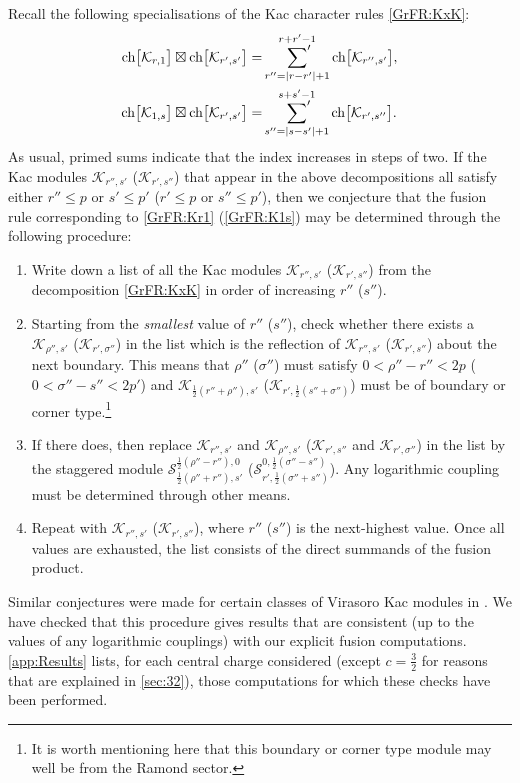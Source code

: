 \documentclass[a4paper,reqno,12pt]{report}
\theoremstyle{definition}
\numberwithin{equation}{section}
\let\originalleft\left     %
\let\originalright\right
\renewcommand{\left}{\mathopen{}\mathclose\bgroup\originalleft}
\renewcommand{\right}{\aftergroup\egroup\originalright}
\newcommand{\abs}[1]{\left\lvert #1 \right\rvert}
\newcommand{\Kac}[1]{\mathcal{K}_{#1}}       %
\newcommand{\Stag}[2]{\mathcal{S}_{#1}^{#2}} %
\newcommand{\chmap}{\mathrm{ch}}
\newcommand{\Gr}[1]{\bigl[ #1 \bigr]}            %
\newcommand{\ch}[1]{\chmap \Gr{#1}}              %
\newcommand{\Grfuse}{\mathbin{\boxtimes}}                                       %
\renewcommand{\le}{\leqslant}
\theoremstyle{plain}
\begin{document}
Recall the following specialisations of the Kac character rules \eqref{GrFR:KxK}:
\begin{subequations}
\begin{align}
\ch{\Kac{r,1}} \Grfuse \ch{\Kac{r',s'}} &= \sideset{}{'} \sum_{r'' = \abs{r-r'}+1}^{r+r'-1} \ch{\Kac{r'',s'}}, \label{GrFR:Kr1} \\
\ch{\Kac{1,s}} \Grfuse \ch{\Kac{r',s'}} &= \sideset{}{'} \sum_{s'' = \abs{s-s'}+1}^{s+s'-1} \ch{\Kac{r',s''}}. \label{GrFR:K1s}
\end{align}
\end{subequations}
As usual, primed sums indicate that the index increases in steps of two.  If the Kac modules $\Kac{r'',s'}$ ($\Kac{r',s''}$) that appear in the above decompositions all satisfy either $r'' \le p$ or $s' \le p'$ ($r' \le p$ or $s'' \le p'$), then we conjecture that the fusion rule corresponding to \cref{GrFR:Kr1} (\cref{GrFR:K1s}) may be determined through the following procedure:
\begin{enumerate}[leftmargin=*,label=\arabic*)]
\item Write down a list of all the Kac modules $\Kac{r'',s'}$ ($\Kac{r',s''}$) from the decomposition \eqref{GrFR:KxK} in order of increasing $r''$ ($s''$). \label{it:KacList}
\item Starting from the \emph{smallest} value of $r''$ ($s''$), check whether there exists a $\Kac{\rho'',s'}$ ($\Kac{r',\sigma''}$) in the list which is the reflection of $\Kac{r'',s'}$ ($\Kac{r',s''}$) about the next boundary.  This means that $\rho''$ ($\sigma''$) must satisfy $0 < \rho'' - r'' < 2p$ ($0 < \sigma'' -s'' < 2p'$) and $\Kac{\frac{1}{2} (r'' + \rho''),s'}$ ($\Kac{r',\frac{1}{2} (s'' + \sigma'')}$) must be of boundary or corner type.\footnote{It is worth mentioning here that this boundary or corner type module may well be from the Ramond sector.}
\item If there does, then replace $\Kac{r'',s'}$ and $\Kac{\rho'',s'}$ ($\Kac{r',s''}$ and $\Kac{r',\sigma''}$) in the list by the staggered module $\Stag{\frac{1}{2} (\rho'' + r''), s'}{\frac{1}{2} (\rho'' - r''),0}$ ($\Stag{r',\frac{1}{2} (\sigma'' + s'')}{0,\frac{1}{2} (\sigma'' - s'')}$).  Any logarithmic coupling must be determined through other means.
\item Repeat with $\Kac{r'',s'}$ ($\Kac{r',s''}$), where $r''$ ($s''$) is the next-highest value.  Once all values are exhausted, the list consists of the direct summands of the fusion product.
\end{enumerate}
Similar conjectures were made for certain classes of Virasoro Kac modules in \cite{EbeVir06,RasFus07,RasFus07b,RidPer07}.  We have checked that this procedure gives results that are consistent (up to the values of any logarithmic couplings) with our explicit fusion computations.  \cref{app:Results} lists, for each central charge considered (except $c=\frac{3}{2}$ for reasons that are explained in \cref{sec:32}), those computations for which these checks have been performed.
\end{document}
